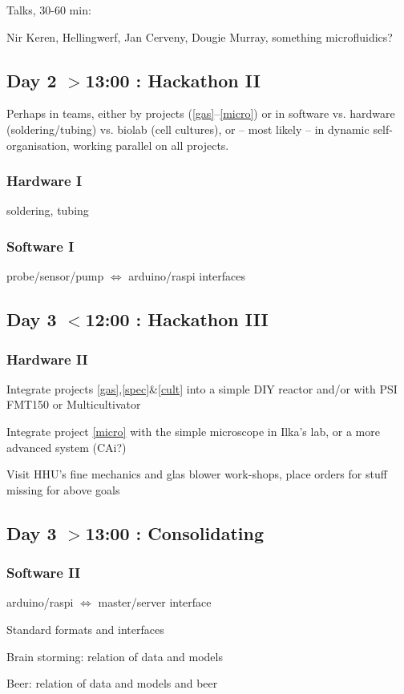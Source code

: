 \documentclass[12pt,a4paper]{article}
\begin{document}
Talks, 30-60 min:

Nir Keren, Hellingwerf, Jan Cerveny, Dougie Murray,
something microfluidics?

\subsection{Day 2 $>$13:00 : Hackathon II}

Perhaps in teams, either by projects (\ref{gas}--\ref{micro}) or in
software vs. hardware (soldering/tubing) vs. biolab (cell cultures),
or -- most likely -- in dynamic self-organisation, working parallel on
all projects.

\subsubsection{Hardware I} 
soldering, tubing

\subsubsection{Software I} 
probe/sensor/pump $\Leftrightarrow$ arduino/raspi interfaces

\subsection{Day 3 $<$12:00 : Hackathon III}

\subsubsection{Hardware II} 
Integrate projects \ref{gas},\ref{spec}\&\ref{cult} into a simple DIY
reactor and/or with PSI FMT150 or Multicultivator

Integrate project \ref{micro} with the simple microscope in Ilka's lab,
or a more advanced system (CAi?)

Visit HHU's fine mechanics and glas blower work-shops, place orders 
for stuff missing for above goals


\subsection{Day 3 $>$13:00 : Consolidating}

\subsubsection{Software II}
arduino/raspi $\Leftrightarrow$  master/server interface

Standard formats and interfaces

Brain storming: relation of data and models

Beer: relation of data and models and beer
\end{document}
